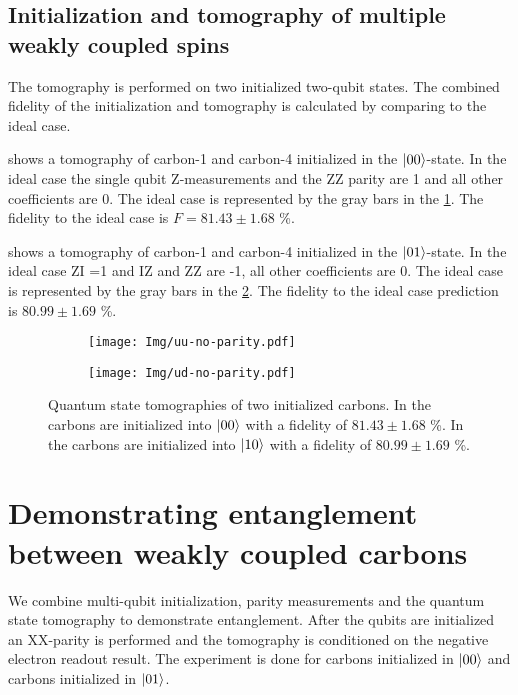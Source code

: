 \subsection{Initialization and tomography of multiple weakly coupled spins}
The tomography is performed on two initialized two-qubit states.
The combined fidelity of the initialization and tomography is calculated by comparing to the ideal case.

 shows a tomography of carbon-1 and carbon-4 initialized in the ${\left\vert{00}\right\rangle}$-state.
In the ideal case the single qubit Z-measurements and the ZZ parity are 1 and all other coefficients are 0.
The ideal case is represented by the gray bars in the \cref{fig:uu-init }.
The fidelity to the ideal case is $F = 81.43 \pm 1.68$ \%.

 shows a tomography of carbon-1 and carbon-4 initialized in the ${\left\vert{01}\right\rangle}$-state.
In the ideal case ZI =1 and IZ and ZZ are -1, all other coefficients are 0.
The ideal case is represented by the gray bars in the \cref{fig:ud-init }.
The fidelity to the ideal case prediction is $80.99 \pm 1.69$ \%.

\begin{figure}[htbp]
    \begin{subfigure}[t]{0.49\textwidth}\centering
        \caption{}
        \texttt{[image: Img/uu-no-parity.pdf]}
        \label{fig:uu-init }
    \end{subfigure}
    \begin{subfigure}[t]{0.49\textwidth}\centering
        \caption{}
        \texttt{[image: Img/ud-no-parity.pdf]}
        \label{fig:ud-init }
    \end{subfigure}
    \caption{ Quantum state tomographies of two initialized carbons. In  the carbons are initialized into ${\left\vert{00}\right\rangle}$ with a fidelity of  $81.43 \pm 1.68$ \%.
    In  the carbons are initialized into ${\left\vert{10}\right\rangle}$ with a fidelity of $80.99 \pm 1.69$ \%.
    }
    \label{fig:2qubitTomos}
\end{figure}

\section{Demonstrating entanglement between weakly coupled carbons}
We combine multi-qubit initialization, parity measurements and the quantum state tomography to demonstrate entanglement.
After the qubits are initialized an XX-parity is performed and the tomography is conditioned on the negative electron readout result.
The experiment is done for carbons initialized in ${\left\vert{00}\right\rangle}$ and carbons initialized in ${\left\vert{01}\right\rangle}$.

